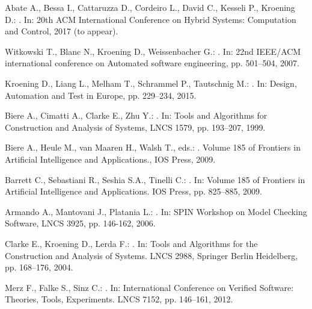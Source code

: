\documentclass{acm_sen_article}
\begin{document}
{{\begin{thebibliography}{1}
Abate A., Bessa I., Cattaruzza D., Cordeiro L., David C., Kesseli P., Kroening D.:
.
\newblock In: 20th ACM International Conference on Hybrid Systems: Computation and Control, 2017 (to appear).

Witkowski T., Blanc N., Kroening D., Weissenbacher G.:
.
\newblock In: 22nd IEEE/ACM international conference on Automated software engineering, pp. 501--504, 2007.

Kroening D., Liang L., Melham T., Schrammel P., Tautschnig M.:
. 
\newblock In: Design, Automation and Test in Europe, pp. 229--234, 2015.

Biere A., Cimatti A., Clarke E., Zhu Y.:
. 
\newblock In: Tools and Algorithms for Construction and Analysis of Systems, LNCS 1579, pp. 193--207, 1999.

Biere A., Heule M., van Maaren H., Walsh T., eds.:
.
\newblock Volume 185 of Frontiers in Artificial Intelligence and Applications., {IOS} Press, 2009.

Barrett C., Sebastiani R., Seshia S.A., Tinelli C.:
. 
\newblock In: Volume 185 of Frontiers in Artificial Intelligence and Applications. IOS Press, pp. 825--885, 2009.

Armando A., Mantovani J., Platania L.:
. 
\newblock In: {SPIN} Workshop on Model Checking Software, LNCS 3925, pp. 146-162, 2006.

Clarke E., Kroening D., Lerda F.:
.
\newblock In: Tools and Algorithms for the Construction and Analysis of Systems. LNCS 2988, Springer Berlin Heidelberg, pp. 168--176, 2004.

Merz F., Falke S., Sinz C.:
.
\newblock In: International Conference on Verified Software: Theories, Tools, Experiments. LNCS 7152, pp. 146--161, 2012.


\end{thebibliography}}}
\end{document}
